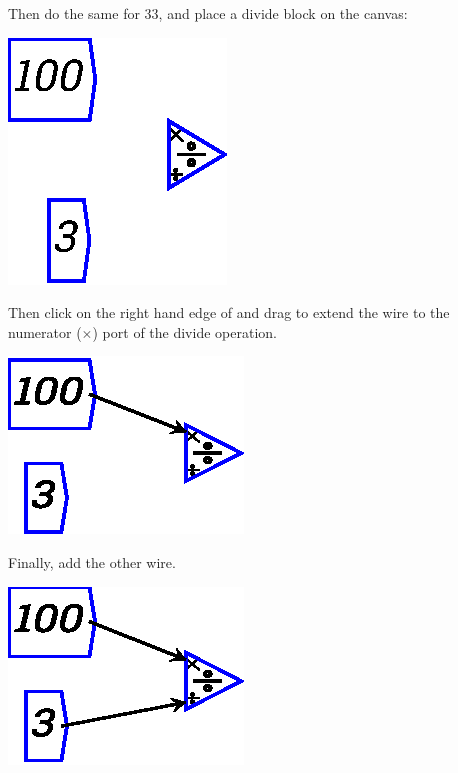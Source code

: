 \begin{center}
\end{center}

Then do the same for 33, and place a divide block on the canvas:

\begin{center}
\includegraphics{images/NewItem123.eps}
\end{center}

Then click on the right hand edge of 
and drag to extend the wire to the numerator ($\times$) port of the divide operation.

\begin{center}
\includegraphics{images/wireExample1.eps}
\end{center}

Finally, add the other wire.
\begin{center}
\includegraphics{images/wireExample2.eps}
\end{center}

